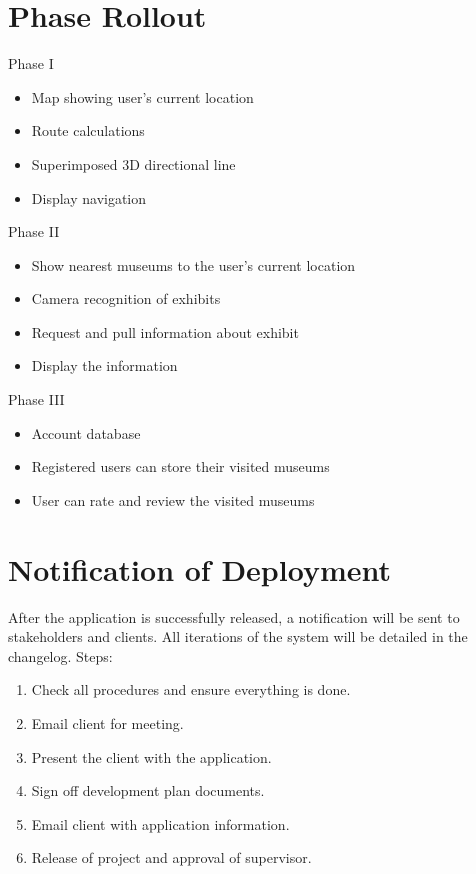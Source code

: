 \documentclass[12pt]{article}
\begin{document}
\section{Phase Rollout}
Phase I
\begin{itemize}
    \item Map showing user's current location
    \item Route calculations
    \item Superimposed 3D directional line
    \item Display navigation
\end{itemize}
Phase II
\begin{itemize}
    \item Show nearest museums to the user's current location
    \item Camera recognition of exhibits
    \item Request and pull information about exhibit
    \item Display the information
\end{itemize}
Phase III
\begin{itemize}
    \item Account database
    \item Registered users can store their visited museums
    \item User can rate and review the visited museums
\end{itemize}

\section{Notification of Deployment}
After the application is successfully released, a notification will be sent to stakeholders and clients. All iterations of the system will be detailed in the changelog.
\newline
Steps:
\begin{enumerate}
    \item Check all procedures and ensure everything is done.
    \item Email client for meeting.
    \item Present the client with the application.
    \item Sign off development plan documents.
    \item Email client with application information.
    \item Release of project and approval of supervisor.
\end{enumerate}
\end{document}
